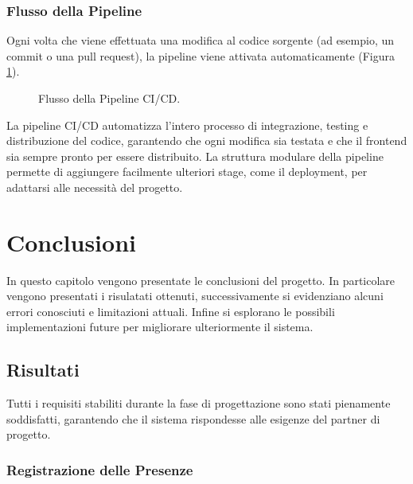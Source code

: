 \documentclass[twoside]{supsistudent}
\begin{document}
\subsection{Flusso della Pipeline}

Ogni volta che viene effettuata una modifica al codice sorgente (ad esempio, un commit o una pull request), la pipeline viene attivata automaticamente (Figura \ref{fig:pipeline}).

\begin{figure}[ht]
  \centering
  \caption{Flusso della Pipeline CI/CD.}
  \label{fig:pipeline}
\end{figure}



La pipeline CI/CD automatizza l'intero processo di integrazione, testing e distribuzione del codice, garantendo che ogni modifica sia testata e che il frontend sia sempre pronto per essere distribuito. La struttura modulare della pipeline permette di aggiungere facilmente ulteriori stage, come il deployment, per adattarsi alle necessità del progetto.

\chapter{Conclusioni}

In questo capitolo vengono presentate le conclusioni del progetto. In particolare vengono presentati i risulatati ottenuti, successivamente si evidenziano alcuni errori conosciuti e limitazioni attuali. Infine si esplorano le possibili implementazioni future per migliorare ulteriormente il sistema.

\section{Risultati}

Tutti i requisiti stabiliti durante la fase di progettazione sono stati pienamente soddisfatti, garantendo che il sistema rispondesse alle esigenze del partner di progetto.

\subsection{Registrazione delle Presenze}
\end{document}
